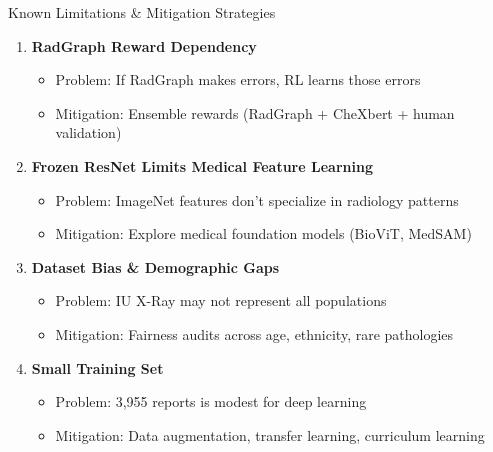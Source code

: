 \documentclass[aspectratio=169]{beamer}
\begin{document}
\begin{frame}{Known Limitations \& Mitigation Strategies}
  
  \begin{enumerate}
    \setlength{\itemsep}{0.4cm}
    
    \item \textbf{RadGraph Reward Dependency}
    \begin{itemize}
      \item Problem: If RadGraph makes errors, RL learns those errors
      \item Mitigation: Ensemble rewards (RadGraph + CheXbert + human validation)
    \end{itemize}
    
    \item \textbf{Frozen ResNet Limits Medical Feature Learning}
    \begin{itemize}
      \item Problem: ImageNet features don't specialize in radiology patterns
      \item Mitigation: Explore medical foundation models (BioViT, MedSAM)
    \end{itemize}
    
    \item \textbf{Dataset Bias \& Demographic Gaps}
    \begin{itemize}
      \item Problem: IU X-Ray may not represent all populations
      \item Mitigation: Fairness audits across age, ethnicity, rare pathologies
    \end{itemize}
    
    \item \textbf{Small Training Set}
    \begin{itemize}
      \item Problem: 3,955 reports is modest for deep learning
      \item Mitigation: Data augmentation, transfer learning, curriculum learning
    \end{itemize}
  \end{enumerate}
  
\end{frame}
\end{document}
